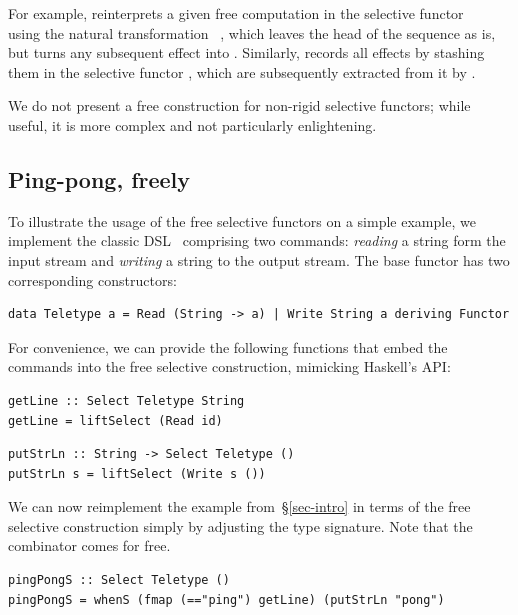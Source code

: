 For example,  reinterprets a given free computation in the selective
functor ~\hs{=}~ using the natural transformation
~, which leaves the  head of the sequence as is,
but turns any subsequent effect into . Similarly, 
records all effects by stashing them in the selective functor , which
are subsequently extracted from it by .

We do not present a free construction for non-rigid selective functors; while
useful, it is more complex and not particularly enlightening.

\subsection{Ping-pong, freely}\label{sec-free-ping-pong}

To illustrate the usage of the free selective functors on a simple example,
we implement the classic  DSL~\cite{swierstra2008data} comprising
two commands: \emph{reading} a string form the input stream and \emph{writing}
a string to the output stream. The base functor has two corresponding
constructors:

\begin{verbatim}
data Teletype a = Read (String -> a) | Write String a deriving Functor
\end{verbatim}

\noindent
For convenience, we can provide the following functions that embed the commands
into the free selective construction, mimicking Haskell's  API:

\vspace{1mm}
\begin{verbatim}
getLine :: Select Teletype String
getLine = liftSelect (Read id)
\end{verbatim}
\vspace{0mm}
\begin{verbatim}
putStrLn :: String -> Select Teletype ()
putStrLn s = liftSelect (Write s ())
\end{verbatim}
\vspace{1mm}

\noindent
We can now reimplement the  example from~\S\ref{sec-intro} in
terms of the free selective construction simply by adjusting the type signature.
Note that the  combinator comes for free.

\vspace{1mm}
\begin{verbatim}
pingPongS :: Select Teletype ()
pingPongS = whenS (fmap (=="ping") getLine) (putStrLn "pong")
\end{verbatim}
\vspace{1mm}

